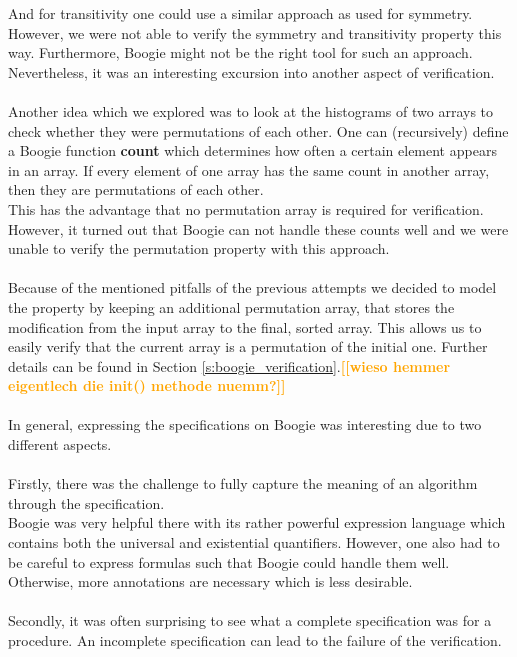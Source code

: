 \documentclass{report}
\newcommand{\todo}[1]{\textsf{\textbf{\textcolor{orange}{[[#1]]}}}}
\begin{document}
And for transitivity one could use a similar approach as used for symmetry.\\
However, we were not able to verify the symmetry and transitivity property this way.
Furthermore, Boogie might not be the right tool for such an approach.
Nevertheless, it was an interesting excursion into another aspect of verification.
\\
\\
Another idea which we explored was to look at the histograms of two arrays to
check whether they were permutations of each other. One can (recursively) define a
Boogie function \textbf{count} which determines how often a certain element appears in an 
array. If every element of one array has the same count in another array, then they
are permutations of each other.\\
This has the advantage that no permutation array is required for verification.\\
However, it turned out that Boogie can not handle these counts well and we were
unable to verify the permutation property with this approach.
\\
\\
Because of the mentioned pitfalls of the previous attempts we decided to model the property by keeping an additional permutation array, that stores the modification from the input array to the final, sorted array. This allows us to easily verify that the current array is a permutation of the initial one. Further details can be found in Section \ref{s:boogie_verification}.\todo{wieso hemmer eigentlech die init() methode nuemm?}
\\\\
In general, expressing the specifications on Boogie was interesting due to two different aspects.
\\
\\
Firstly, there was the challenge to fully capture the meaning of an algorithm
through the specification.\\
Boogie was very helpful there with its rather powerful expression language which
contains both the universal and existential quantifiers.
However, one also had to be careful to express formulas such that Boogie could
handle them well. Otherwise, more annotations are necessary which is less desirable.
\\
\\
Secondly, it was often surprising to see what a complete specification was for a procedure.
An incomplete specification can lead to the failure of the verification.
\end{document}
